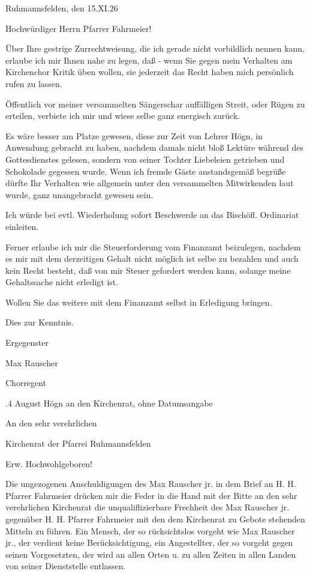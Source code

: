 \documentclass[12pt,a4pager]{book}
\begin{document}
Ruhmannsfelden, den 15.XI.26



Hochwürdiger Herrn Pfarrer Fahrmeier!



Über Ihre gestrige Zurrechtweisung, die ich gerade nicht vorbildlich nennen
kann, erlaube ich mir Ihnen nahe zu legen, daß - wenn Sie gegen mein Verhalten
am Kirchenchor Kritik üben wollen, sie jederzeit das Recht haben mich persönlich
rufen zu lassen.

Öffentlich vor meiner versammelten Sängerschar auffälligen Streit, oder Rügen zu
erteilen, verbiete ich mir und wiese selbe ganz energisch zurück.

Es wäre besser am Platze gewesen, diese zur Zeit von Lehrer Högn, in Anwendung
gebracht zu haben, nachdem damals nicht bloß Lektüre während des Gottesdienstes
gelesen, sondern von seiner Tochter Liebeleien getrieben und Schokolade gegessen
wurde. Wenn ich fremde Gäste anstandsgemäß begrüße dürfte Ihr Verhalten wie
allgemein unter den versammelten Mitwirkenden laut wurde, ganz unangebracht
gewesen sein.

Ich würde bei evtl. Wiederholung sofort Beschwerde an das Bischöfl. Ordinariat
einleiten.

Ferner erlaube ich mir die Steuerforderung vom Finanzamt beizulegen, nachdem es
mir mit dem derzeitigen Gehalt nicht möglich ist selbe zu bezahlen und auch kein
Recht besteht, daß von mir Steuer gefordert werden kann, solange meine
Gehaltssache nicht erledigt ist.

Wollen Sie das weitere mit dem Finanzamt selbst in Erledigung bringen.



Dies zur Kenntnis.



    Ergegenster



        Max Rauscher

            Chorregent

.4 August Högn an den Kirchenrat, ohne Datumsangabe



An den sehr verehrlichen

Kirchenrat der Pfarrei Ruhmannsfelden



Erw. Hochwohlgeboren!



Die ungezogenen Anschuldigungen des Max Rauscher jr. in dem Brief an H. H.
Pfarrer Fahrmeier drücken mir die Feder in die Hand mit der Bitte an den sehr
verehrlichen Kirchenrat die unqualiflizierbare Frechheit des Max Rauscher jr.
gegenüber H. H. Pfarrer Fahrmeier mit den dem Kirchenrat zu Gebote stehenden
Mitteln zu führen. Ein Mensch, der so rücksichtslos vorgeht wie Max Rauscher
jr., der verdient keine Berücksichtigung, ein Angestellter, der so vorgeht gegen
seinen Vorgesetzten, der wird an allen Orten u. zu allen Zeiten in allen Landen
von seiner Dienststelle entlassen.
\end{document}
